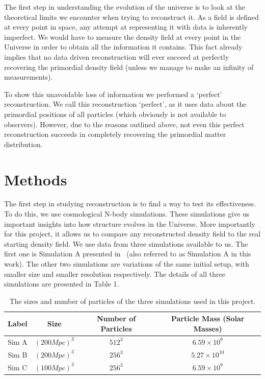 

\indent The first step in understanding the evolution of the universe is to look at the theoretical limits we encounter when trying to reconstruct it. As a field is defined at every point in space, any attempt at representing it with data is inherently imperfect. We would have to measure the density field at every point in the Universe in order to obtain all the information it contains. This fact already implies that no data driven reconstruction will ever succeed at perfectly recovering the primordial density field (unless we manage to make an infinity of measurements).

To show this unavoidable loss of information we performed a `perfect' reconstruction. We call this reconstruction `perfect', as it uses data about the primordial positions of all particles (which obviously is not available to observers). However, due to the reasons outlined above, not even this perfect reconstruction succeeds in completely recovering the primordial matter distribution.

\section{Methods}


The first step in studying reconstruction is to find a way to test its effectiveness. To do this, we use cosmological N-body simulations. These simulations give us important insights into how structure evolves in the Universe. More importantly for this project, it allows us to compare any reconstructed density field to the real starting density field. We use data from three simulations available to us. The first one is Simulation A presented in~\cite{Pontzen_paired_simulations} (also referred to as Simulation A in this work). The other two simulations are variations of the same initial setup, with smaller size and smaller resolution respectively. The details of all three simulations are presented in Table 1.
\begin{table}[h!]
    \centering
    \begin{tabular}{ |c|c|c|c| } 
        \hline
        Label & Size & Number of Particles & Particle Mass (Solar Masses) \\
        \hline
        Sim A & $(200 Mpc)^3$ & $512^3$ & $6.59 \times 10^9$ \\ 
        \hline
        Sim B & $(200 Mpc)^3$ & $256^3$ & $5.27 \times 10^{10}$ \\ 
        \hline
        Sim C & $(100 Mpc)^3$ & $256^3$ & $6.59 \times 10^9$ \\ 
        \hline
        
    \end{tabular}
    \caption{The sizes and number of particles of the three simulations used in this project.}
    \label{table:1}
\end{table}

